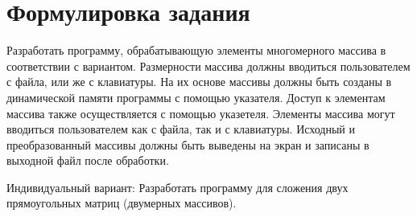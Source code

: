 \section*{Формулировка задания}

Разработать программу, обрабатывающую элементы многомерного
массива в соответствии с вариантом.
Размерности массива должны вводиться пользователем с файла, или же
с клавиатуры.
На их основе массивы должны быть созданы в динамической
памяти программы с помощью указателя.
Доступ к элементам массива также осуществляется с помощью указетеля.
Элементы массива могут вводиться пользователем как с файла, так и с
клавиатуры.
Исходный и преобразованный массивы должны быть выведены на экран
и записаны в выходной файл после обработки.

Индивидуальный вариант: Разработать программу для сложения двух 
прямоугольных матриц (двумерных массивов).